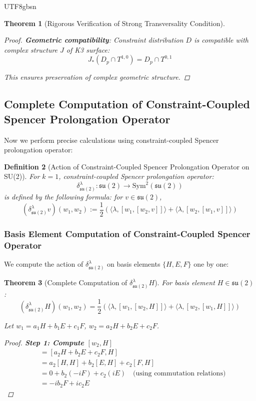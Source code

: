 \documentclass[a4paper,12pt]{extarticle}
\newtheorem{theorem}{Theorem}[section]
\newtheorem{definition}[theorem]{Definition}
\theoremstyle{definition}
\begin{document}
\begin{CJK}{UTF8}{gbsn}
\begin{theorem}[Rigorous Verification of Strong Transversality Condition]
\begin{proof}
\textbf{Geometric compatibility}:
Constraint distribution $D$ is compatible with complex structure $J$ of K3 surface:
$$J_*(D_p \cap T^{1,0}) = D_p \cap T^{0,1}$$

This ensures preservation of complex geometric structure.
\end{proof}
\end{theorem}

\subsection{Complete Computation of Constraint-Coupled Spencer Prolongation Operator}
\label{subsec:constraint_coupled_spencer_operator}

Now we perform precise calculations using constraint-coupled Spencer prolongation operator:

\begin{definition}[Action of Constraint-Coupled Spencer Prolongation Operator on SU(2)]
\label{def:constraint_coupled_spencer_su2}
For $k = 1$, constraint-coupled Spencer prolongation operator:
$$\delta^\lambda_{\mathfrak{su}(2)}: \mathfrak{su}(2) \to \text{Sym}^2(\mathfrak{su}(2))$$
is defined by the following formula: for $v \in \mathfrak{su}(2)$,
$$(\delta^\lambda_{\mathfrak{su}(2)}v)(w_1, w_2) := \frac{1}{2} \left( \langle \lambda, [w_1, [w_2, v]] \rangle + \langle \lambda, [w_2, [w_1, v]] \rangle \right)$$
\end{definition}

\subsubsection{Basis Element Computation of Constraint-Coupled Spencer Operator}
\label{subsubsec:spencer_operator_basis_computation}

We compute the action of $\delta^\lambda_{\mathfrak{su}(2)}$ on basis elements $\{H, E, F\}$ one by one:

\begin{theorem}[Complete Computation of $\delta^\lambda_{\mathfrak{su}(2)}H$]
\label{thm:spencer_operator_H}
For basis element $H \in \mathfrak{su}(2)$:
$$(\delta^\lambda_{\mathfrak{su}(2)}H)(w_1, w_2) = \frac{1}{2} \left( \langle \lambda, [w_1, [w_2, H]] \rangle + \langle \lambda, [w_2, [w_1, H]] \rangle \right)$$

Let $w_1 = a_1 H + b_1 E + c_1 F$, $w_2 = a_2 H + b_2 E + c_2 F$.

\begin{proof}
\textbf{Step 1: Compute $[w_2, H]$}
\begin{align}
[w_2, H] &= [a_2 H + b_2 E + c_2 F, H]\\
&= a_2[H, H] + b_2[E, H] + c_2[F, H]\\
&= 0 + b_2(-iF) + c_2(iE) \quad \text{(using commutation relations)}\\
&= -ib_2 F + ic_2 E
\end{align}


\end{proof}
\end{theorem}
\end{CJK}
\end{document}
